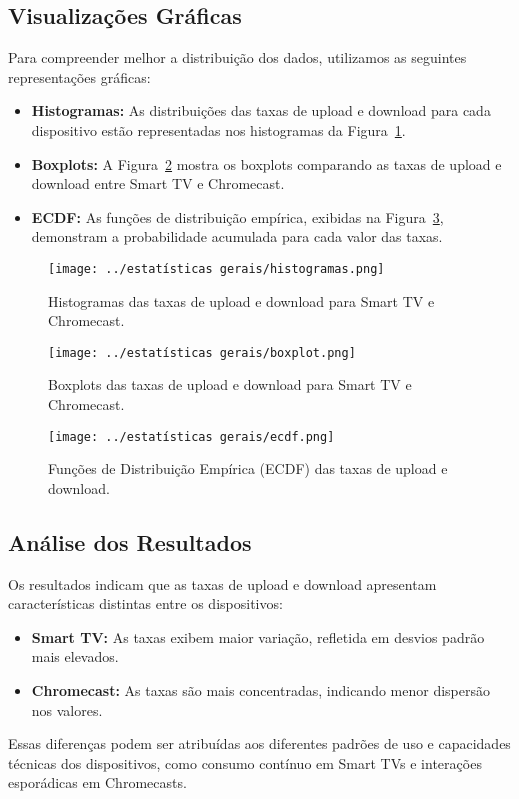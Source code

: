 \subsection{Visualizações Gráficas}

Para compreender melhor a distribuição dos dados, utilizamos as seguintes representações gráficas:

\begin{itemize}
    \item \textbf{Histogramas:} As distribuições das taxas de upload e download para cada dispositivo estão representadas nos histogramas da Figura~\ref{fig:histogramas}.
    \item \textbf{Boxplots:} A Figura~\ref{fig:boxplots} mostra os boxplots comparando as taxas de upload e download entre Smart TV e Chromecast.
    \item \textbf{ECDF:} As funções de distribuição empírica, exibidas na Figura~\ref{fig:ecdf}, demonstram a probabilidade acumulada para cada valor das taxas.
\end{itemize}

\begin{figure}[H]
    \centering
    \texttt{[image: ../estatísticas gerais/histogramas.png]}
    \caption{Histogramas das taxas de upload e download para Smart TV e Chromecast.}
    \label{fig:histogramas}
\end{figure}

\begin{figure}[H]
    \centering
    \texttt{[image: ../estatísticas gerais/boxplot.png]}
    \caption{Boxplots das taxas de upload e download para Smart TV e Chromecast.}
    \label{fig:boxplots}
\end{figure}

\begin{figure}[H]
    \centering
    \texttt{[image: ../estatísticas gerais/ecdf.png]}
    \caption{Funções de Distribuição Empírica (ECDF) das taxas de upload e download.}
    \label{fig:ecdf}
\end{figure}

\subsection{Análise dos Resultados}

Os resultados indicam que as taxas de upload e download apresentam características distintas entre os dispositivos:
\begin{itemize}
    \item \textbf{Smart TV:} As taxas exibem maior variação, refletida em desvios padrão mais elevados. 
    \item \textbf{Chromecast:} As taxas são mais concentradas, indicando menor dispersão nos valores.
\end{itemize}

Essas diferenças podem ser atribuídas aos diferentes padrões de uso e capacidades técnicas dos dispositivos, como consumo contínuo em Smart TVs e interações esporádicas em Chromecasts.

